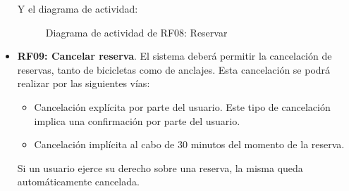 \begin{itemize}
	Y el diagrama de actividad:
	\begin{figure}[!htb]
		\centering
		\caption{Diagrama de actividad de RF08: Reservar}
		\label{fig:diagramaActividad_RF08}
	\end{figure}
	
	\FloatBarrier
	\item \textbf{RF09: Cancelar reserva}. El sistema deberá permitir la cancelación de reservas, tanto de bicicletas como de anclajes. Esta cancelación se podrá realizar por las siguientes vías:
	\begin{itemize}
		\item Cancelación explícita por parte del usuario. Este tipo de cancelación implica una confirmación por parte del usuario.
		\item Cancelación implícita al cabo de 30 minutos del momento de la reserva.
	\end{itemize}
	Si un usuario ejerce su derecho sobre una reserva, la misma queda automáticamente cancelada.
	

\end{itemize}
